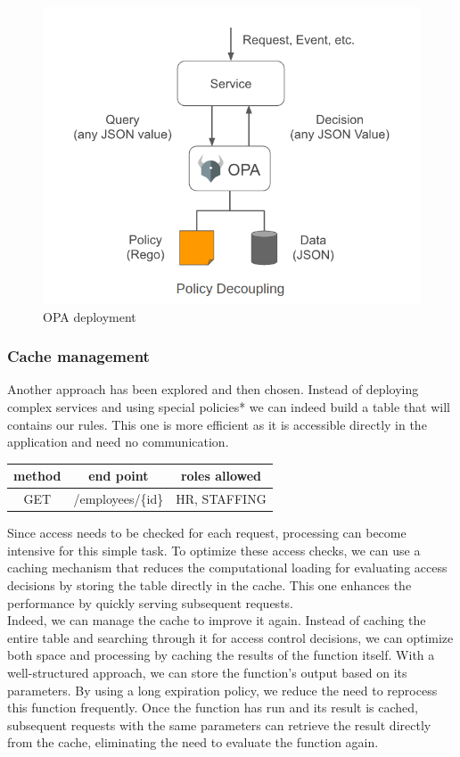 \documentclass[12pt,a4paper,table,english]{article}
\begin{document}
	\begin{figure}[H]
		\includegraphics[width=150mm]{Image/OPA}
		\caption{OPA deployment}
		\label{fig:OPA deployment}
	\end{figure}
	
	\pagebreak
	\subsubsection{Cache management}
	
	Another approach has been explored and then chosen. Instead of deploying complex services and using special policies* we can indeed build a table that will contains our rules. This one is more efficient as it is accessible directly in the application and need no communication.
	
	\begin{center}
		\begin{tabular}{| c | c | c |}
			\hline
			method & end point & roles allowed\\ \hline
			GET & /employees/\{id\} & HR, STAFFING\\
			\hline
		\end{tabular}
	\end{center}
	
	\noindent Since access needs to be checked for each request, processing can become intensive for this simple task. To optimize these access checks, we can use a caching mechanism that reduces the computational loading for evaluating access decisions by storing the table directly in the cache. This one enhances the performance by quickly serving subsequent requests.\\
	Indeed, we can manage the cache to improve it again. 
	Instead of caching the entire table and searching through it for access control decisions, we can optimize both space and processing by caching the results of the function itself. With a well-structured approach, we can store the function's output based on its parameters. By using a long expiration policy, we reduce the need to reprocess this function frequently. Once the function has run and its result is cached, subsequent requests with the same parameters can retrieve the result directly from the cache, eliminating the need to evaluate the function again.
	
\end{document}
